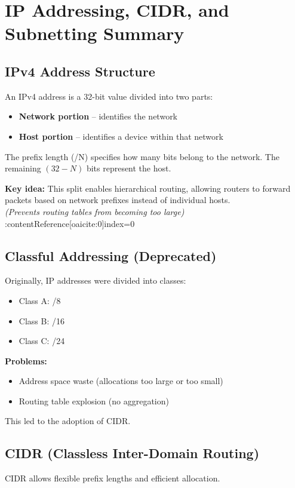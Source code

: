 \section{IP Addressing, CIDR, and Subnetting Summary}

\subsection{IPv4 Address Structure}
An IPv4 address is a 32-bit value divided into two parts:
\begin{itemize}
    \item \textbf{Network portion} -- identifies the network
    \item \textbf{Host portion} -- identifies a device within that network
\end{itemize}

The prefix length (/N) specifies how many bits belong to the network. The remaining $(32 - N)$ bits represent the host.

\textbf{Key idea:} This split enables hierarchical routing, allowing routers to forward packets based on network prefixes instead of individual hosts. \\
\textit{(Prevents routing tables from becoming too large)} :contentReference[oaicite:0]{index=0}

\subsection{Classful Addressing (Deprecated)}
Originally, IP addresses were divided into classes:

\begin{itemize}
    \item Class A: /8
    \item Class B: /16
    \item Class C: /24
\end{itemize}

\textbf{Problems:}
\begin{itemize}
    \item Address space waste (allocations too large or too small)
    \item Routing table explosion (no aggregation)
\end{itemize}

This led to the adoption of CIDR.

\subsection{CIDR (Classless Inter-Domain Routing)}
CIDR allows flexible prefix lengths and efficient allocation.

